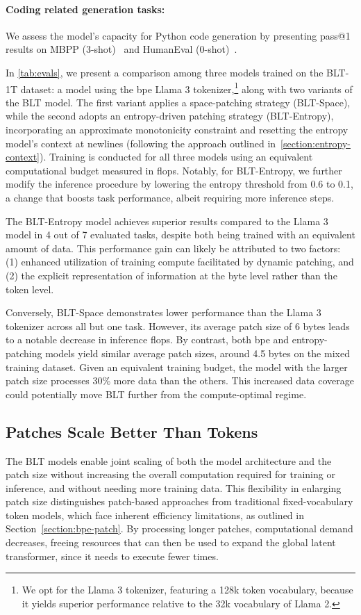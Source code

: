 \paragraph{Coding related generation tasks:} We assess the model’s capacity for Python code generation by presenting pass@1 results on MBPP (3-shot)~\citep{Eval_MBPP} and HumanEval (0-shot)~\citep{Eval_HumanEval}.

In \autoref{tab:evals}, we present a comparison among three models trained on the {\textsc BLT}-1T dataset: a model using the bpe Llama 3 tokenizer,\footnote{We opt for the Llama 3 tokenizer, featuring a 128k token vocabulary, because it yields superior performance relative to the 32k vocabulary of Llama 2.} along with two variants of the {\textsc BLT} model. The first variant applies a space-patching strategy ({\textsc BLT}-Space), while the second adopts an entropy-driven patching strategy ({\textsc BLT}-Entropy), incorporating an approximate monotonicity constraint and resetting the entropy model's context at newlines (following the approach outlined in~\autoref{section:entropy-context}). Training is conducted for all three models using an equivalent computational budget measured in flops. Notably, for {\textsc BLT}-Entropy, we further modify the inference procedure by lowering the entropy threshold from 0.6 to 0.1, a change that boosts task performance, albeit requiring more inference steps.

The {\textsc BLT}-Entropy model achieves superior results compared to the Llama 3 model in 4 out of 7 evaluated tasks, despite both being trained with an equivalent amount of data. This performance gain can likely be attributed to two factors: (1) enhanced utilization of training compute facilitated by dynamic patching, and (2) the explicit representation of information at the byte level rather than the token level.

Conversely, {\textsc BLT}-Space demonstrates lower performance than the Llama 3 tokenizer across all but one task. However, its average patch size of 6 bytes leads to a notable decrease in inference flops. By contrast, both bpe and entropy-patching models yield similar average patch sizes, around 4.5 bytes on the mixed training dataset. Given an equivalent training budget, the model with the larger patch size processes 30\% more data than the others. This increased data coverage could potentially move {\textsc BLT} further from the compute-optimal regime.

\subsection{Patches Scale Better Than Tokens} The {\textsc BLT} models enable joint scaling of both the model architecture and the patch size without increasing the overall computation required for training or inference, and without needing more training data. This flexibility in enlarging patch size distinguishes patch-based approaches from traditional fixed-vocabulary token models, which face inherent efficiency limitations, as outlined in Section~\ref{section:bpe-patch}. By processing longer patches, computational demand decreases, freeing resources that can then be used to expand the global latent transformer, since it needs to execute fewer times.

